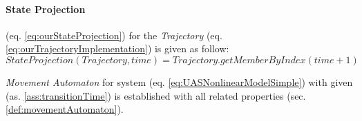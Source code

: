 \paragraph{State Projection} (eq. \ref{eq:ourStateProjection}) for the \emph{Trajectory} (eq. \ref{eq:ourTrajectoryImplementation}) is given as follow:
\begin{equation}\label{eq:ourStateProjection}
    StateProjection(Trajectory,time) = Trajectory.getMemberByIndex(time+1)
\end{equation}

\begin{note}
    \emph{Movement Automaton} for system (eq. \ref{eq:UASNonlinearModelSimple}) with given (as. \ref{ass:transitionTime}) is established with all related properties (sec. \ref{def:movementAutomaton}).
\end{note}
